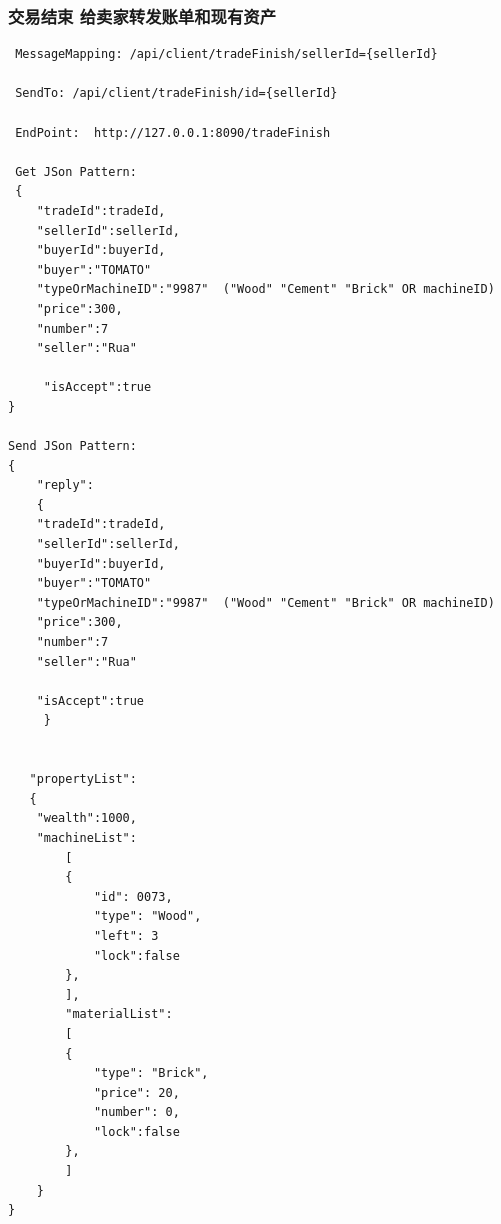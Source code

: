 \documentclass{article}
\begin{document}
				\subsubsection{交易结束 给卖家转发账单和现有资产}
\begin{lstlisting}
 MessageMapping: /api/client/tradeFinish/sellerId={sellerId}

 SendTo: /api/client/tradeFinish/id={sellerId}

 EndPoint:  http://127.0.0.1:8090/tradeFinish

 Get JSon Pattern:
 {
    "tradeId":tradeId,
    "sellerId":sellerId,
    "buyerId":buyerId,
    "buyer":"TOMATO"
    "typeOrMachineID":"9987"  ("Wood" "Cement" "Brick" OR machineID)
    "price":300,
    "number":7
    "seller":"Rua"

     "isAccept":true
}

Send JSon Pattern:
{
    "reply":
    {
    "tradeId":tradeId,
    "sellerId":sellerId,
    "buyerId":buyerId,
    "buyer":"TOMATO"
    "typeOrMachineID":"9987"  ("Wood" "Cement" "Brick" OR machineID)
    "price":300,
    "number":7
    "seller":"Rua"

    "isAccept":true
     }


   "propertyList":
   {
   	"wealth":1000,
   	"machineList":
    	[
        {
            "id": 0073,
            "type": "Wood",
            "left": 3
            "lock":false
        },
        ],
    	"materialList":
    	[
        {
            "type": "Brick",
            "price": 20,
            "number": 0,
            "lock":false
        },
    	]
    }
}
\end{lstlisting}
\end{document}
